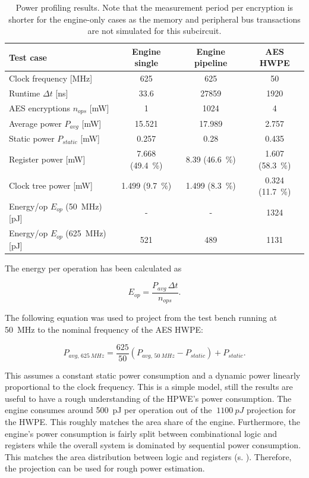 \documentclass[a4paper, 12pt]{article}
\begin{document}
\begin{table}[h]
    \centering
    \begin{tabular}{l|c c c}
        \toprule
        Test case & Engine single &  Engine pipeline & AES HWPE \\
        \midrule
		Clock frequency [MHz] & 625 & 625 & 50 \\
		Runtime $\Delta t$ [ns] & 33.6 & 27859 & 1920 \\
		AES encryptions $n_{ops}$ [mW] & 1 & 1024 & 4 \\	
		Average power $P_{avg}$ [mW] & 15.521 & 17.989 & 2.757 \\
		Static power $P_{static}$ [mW] & 0.257 & 0.28 & 0.435 \\
		Register power [mW] & 7.668 (\SI{49.4}{\percent}) & 8.39 (\SI{46.6}{\percent}) & 1.607 (\SI{58.3}{\percent}) \\
		Clock tree power [mW] & 1.499 (\SI{9.7}{\percent}) & 1.499 (\SI{8.3}{\percent}) & 0.324 (\SI{11.7}{\percent}) \\	
		Energy/op $E_{op}$ (\SI{50}{MHz}) [pJ] & - & - & 1324 \\	
		Energy/op $E_{op}$ (\SI{625}{MHz}) [pJ] & 521 & 489 & 1131 \\
        \bottomrule
    \end{tabular}
	\caption{Power profiling results. Note that the measurement period per encryption is shorter for the engine-only cases as the memory and peripheral bus transactions are not simulated for this subcircuit.}
	\label{tab:results-power}
\end{table}

The energy per operation has been calculated as

\begin{equation*}
	E_{op} = \frac{P_{avg}\,\Delta t}{n_{ops}}.
\end{equation*}

The following equation was used to project from the test bench running at \SI{50}{MHz} to the nominal frequency of the AES HWPE:

\begin{equation*}
	P_{avg,\,\SI{625}{MHz}} = \frac{625}{50} \left(P_{avg,\,\SI{50}{MHz}} - P_{static} \right) + P_{static}.
\end{equation*}

This assumes a constant static power consumption and a dynamic power linearly proportional to the clock frequency. This is a simple model, still the results are useful to have a rough understanding of the HPWE's power consumption. The engine consumes around \SI{500}{pJ} per operation out of the $~\SI{1100}{pJ}$ projection for the HWPE. This roughly matches the area share of the engine. Furthermore, the engine's power consumption is fairly split between combinational logic and registers while the overall system is dominated by sequential power consumption. This matches the area distribution between logic and registers (s. ). Therefore, the projection can be used for rough power estimation.
\end{document}
